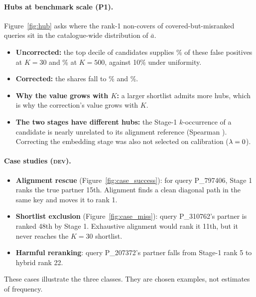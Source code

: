 \documentclass[10pt]{article}
\newcommand{\tier}[1]{\textsc{#1}}
\begin{document}
\paragraph{Hubs at benchmark scale (P1).} Figure~\ref{fig:hub} asks where the rank-1 non-covers of covered-but-misranked queries sit in the catalogue-wide distribution of $\bar a$.
\begin{itemize}
\item \textbf{Uncorrected:} the top decile of candidates supplies \POneUncThirtyTopDecile\% of these false positives at $K=30$ and \POneUncFiveHundredTopDecile\% at $K=500$, against 10\% under uniformity.
\item \textbf{Corrected:} the shares fall to \POneCorThirtyTopDecile\% and \POneCorFiveHundredTopDecile\%.
\item \textbf{Why the value grows with $K$:} a larger shortlist admits more hubs, which is why the correction's value grows with $K$.
\item \textbf{The two stages have different hubs:} the Stage-1 $k$-occurrence of a candidate is nearly unrelated to its alignment reference (Spearman \POneKoccRho). Correcting the embedding stage was also not selected on calibration ($\lambda=0$).
\end{itemize}

\paragraph{Case studies (\tier{dev}).}
\begin{itemize}
\item \textbf{Alignment rescue} (Figure~\ref{fig:case_success}): for query P\_797406, Stage 1 ranks the true partner 15th. Alignment finds a clean diagonal path in the same key and moves it to rank 1.
\item \textbf{Shortlist exclusion} (Figure~\ref{fig:case_miss}): query P\_310762's partner is ranked 48th by Stage 1. Exhaustive alignment would rank it 11th, but it never reaches the $K=30$ shortlist.
\item \textbf{Harmful reranking}: query P\_207372's partner falls from Stage-1 rank 5 to hybrid rank 22.
\end{itemize}
These cases illustrate the three classes. They are chosen examples, not estimates of frequency.
\end{document}
